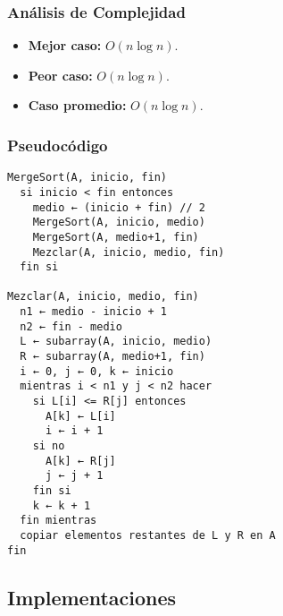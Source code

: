 \documentclass[11pt,openany]{book}
\begin{document}
\subsubsection{Análisis de Complejidad}
\begin{itemize}
    \item \textbf{Mejor caso:} $O(n \log n)$.
    \item \textbf{Peor caso:} $O(n \log n)$.
    \item \textbf{Caso promedio:} $O(n \log n)$.
\end{itemize}

\subsubsection{Pseudocódigo}
\begin{verbatim}
MergeSort(A, inicio, fin)
  si inicio < fin entonces
    medio ← (inicio + fin) // 2
    MergeSort(A, inicio, medio)
    MergeSort(A, medio+1, fin)
    Mezclar(A, inicio, medio, fin)
  fin si

Mezclar(A, inicio, medio, fin)
  n1 ← medio - inicio + 1
  n2 ← fin - medio
  L ← subarray(A, inicio, medio)
  R ← subarray(A, medio+1, fin)
  i ← 0, j ← 0, k ← inicio
  mientras i < n1 y j < n2 hacer
    si L[i] <= R[j] entonces
      A[k] ← L[i]
      i ← i + 1
    si no
      A[k] ← R[j]
      j ← j + 1
    fin si
    k ← k + 1
  fin mientras
  copiar elementos restantes de L y R en A
fin
\end{verbatim}

\subsection{Implementaciones}
\end{document}
